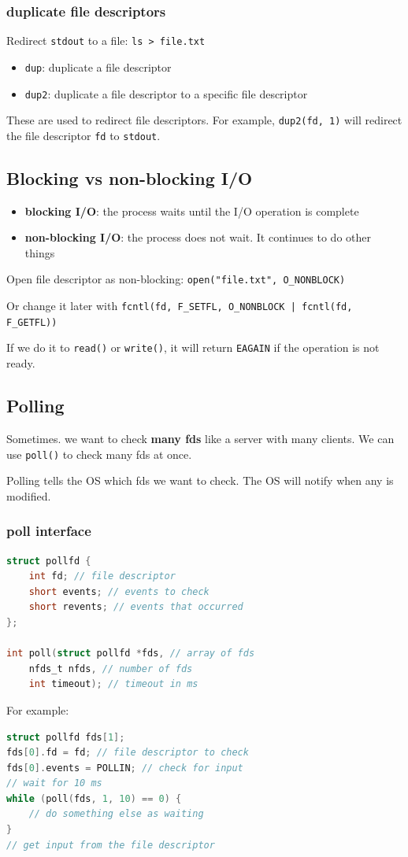 \documentclass[letterpaper,12pt]{article}
\begin{document}
\subsubsection{duplicate file descriptors}
Redirect \texttt{stdout} to a file: \texttt{ls > file.txt}


\begin{itemize}
    \item \texttt{dup}: duplicate a file descriptor
    \item \texttt{dup2}: duplicate a file descriptor to a specific file descriptor
\end{itemize}
These are used to redirect file descriptors. For example, \texttt{dup2(fd, 1)} will redirect the file descriptor \texttt{fd} to \texttt{stdout}.

\subsection{Blocking vs non-blocking I/O}
\begin{itemize}
    \item \textbf{blocking I/O}: the process waits until the I/O operation is complete
    \item \textbf{non-blocking I/O}: the process does not wait. It continues to do other things
\end{itemize}
Open file descriptor as non-blocking: \texttt{open("file.txt", O\_NONBLOCK)}

Or change it later with \texttt{fcntl(fd, F\_SETFL, O\_NONBLOCK | fcntl(fd, F\_GETFL))}

If we do it to \texttt{read()} or \texttt{write()}, it will return \texttt{EAGAIN} if the operation is not ready.
\subsection{Polling}
Sometimes. we want to check \textbf{many fds} like a server with many clients. We can use \texttt{poll()} to check many fds at once.

Polling tells the OS which fds we want to check. The OS will notify when any is modified.

\subsubsection{poll interface}
\begin{lstlisting}[language=C]
struct pollfd {
    int fd; // file descriptor
    short events; // events to check
    short revents; // events that occurred
};

int poll(struct pollfd *fds, // array of fds
    nfds_t nfds, // number of fds
    int timeout); // timeout in ms
\end{lstlisting}
For example: \begin{lstlisting}[language=C]
struct pollfd fds[1];
fds[0].fd = fd; // file descriptor to check
fds[0].events = POLLIN; // check for input
// wait for 10 ms
while (poll(fds, 1, 10) == 0) {
    // do something else as waiting
}
// get input from the file descriptor
\end{lstlisting}
\end{document}
